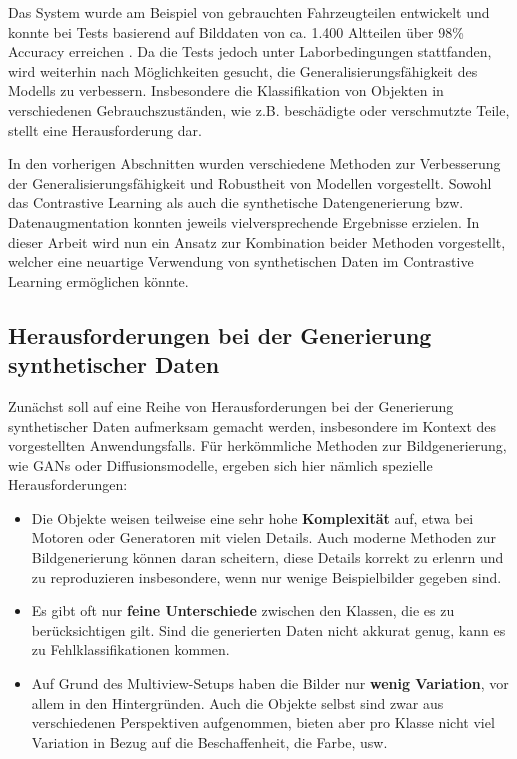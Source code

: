 Das System wurde am Beispiel von gebrauchten Fahrzeugteilen entwickelt und konnte bei Tests basierend auf Bilddaten von ca. 1.400 Altteilen über 98\% Accuracy erreichen \parencite{ReziProK2019eiba}. Da die Tests jedoch unter Laborbedingungen stattfanden, wird weiterhin nach Möglichkeiten gesucht, die Generalisierungsfähigkeit des Modells zu verbessern. Insbesondere die Klassifikation von Objekten in verschiedenen Gebrauchszuständen, wie z.B. beschädigte oder verschmutzte Teile, stellt eine Herausforderung dar.

In den vorherigen Abschnitten wurden verschiedene Methoden zur Verbesserung der Generalisierungsfähigkeit und Robustheit von Modellen vorgestellt. Sowohl das Contrastive Learning als auch die synthetische Datengenerierung bzw. Datenaugmentation konnten jeweils vielversprechende Ergebnisse erzielen. In dieser Arbeit wird nun ein Ansatz zur Kombination beider Methoden vorgestellt, welcher eine neuartige Verwendung von synthetischen Daten im Contrastive Learning ermöglichen könnte.

\subsection{Herausforderungen bei der Generierung synthetischer Daten} \label{sec:challenges-synt-data}

Zunächst soll auf eine Reihe von Herausforderungen bei der Generierung synthetischer Daten aufmerksam gemacht werden, insbesondere im Kontext des vorgestellten Anwendungsfalls. Für herkömmliche Methoden zur Bildgenerierung, wie GANs oder Diffusionsmodelle, ergeben sich hier nämlich spezielle Herausforderungen:

\begin{itemize}
	\item Die Objekte weisen teilweise eine sehr hohe \textbf{Komplexität} auf, etwa bei Motoren oder Generatoren mit vielen Details. Auch moderne Methoden zur Bildgenerierung können daran scheitern, diese Details korrekt zu erlenrn und zu reproduzieren \textemdash insbesondere, wenn nur wenige Beispielbilder gegeben sind.
	\item Es gibt oft nur \textbf{feine Unterschiede} zwischen den Klassen, die es zu berücksichtigen gilt. Sind die generierten Daten nicht akkurat genug, kann es zu Fehlklassifikationen kommen.
	\item Auf Grund des Multiview-Setups haben die Bilder nur \textbf{wenig Variation}, vor allem in den Hintergründen. Auch die Objekte selbst sind zwar aus verschiedenen Perspektiven aufgenommen, bieten aber pro Klasse nicht viel Variation in Bezug auf die Beschaffenheit, die Farbe, usw.
\end{itemize}

